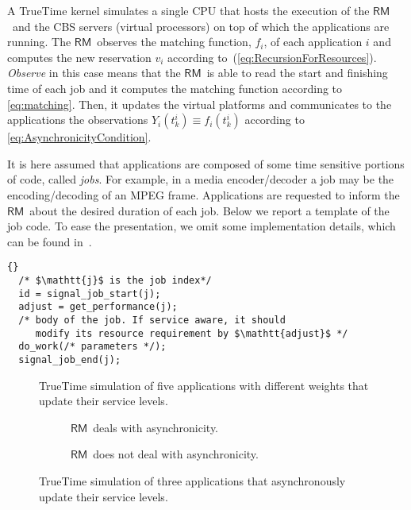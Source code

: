 \documentclass[letter,11pt]{article}
\newif\iffigures
\begin{document}
A TrueTime kernel simulates a single CPU that hosts the execution of the {$\mathsf{RM}$}\ and the CBS servers (virtual processors) on top of which the applications are running.
The {$\mathsf{RM}$}\ observes the matching function, $f_i$, of each application $i$ and computes the new reservation $v_i$ according to~(\ref{eq:RecursionForResources}). \emph{Observe} in this case means that the {$\mathsf{RM}$}\ is able to read the
start and finishing time of each job and it computes the matching function according to \eqref{eq:matching}. Then, it updates the virtual platforms and communicates to the applications the observations $Y_{i}(t^i_k)\equiv f_i(t^i_k)$ according to \eqref{eq:AsynchronicityCondition}.  

It is here assumed that applications are composed of some time sensitive portions of code, called \emph{jobs}. For example, in a media encoder/decoder a
job may be the encoding/decoding of an MPEG frame. Applications are
requested to inform the {$\mathsf{RM}$}\ about the desired duration of each
job. Below we report a template of the job code. To ease the
presentation, we omit some implementation details, which can be found
in~\cite{MagECRTS}.
\begin{lstlisting}[style=compactCStyle]{}
  /* $\mathtt{j}$ is the job index*/
  id = signal_job_start(j);
  adjust = get_performance(j);
  /* body of the job. If service aware, it should
     modify its resource requirement by $\mathtt{adjust}$ */
  do_work(/* parameters */);
  signal_job_end(j);
\end{lstlisting}
\begin{figure}[t]
  \begin{center}
    \iffigures
    
    \texttt{[image: figure\_truetime\_servicelevelweights\_new\_FULL\_ind.pdf]}
    \fi
    \caption{TrueTime simulation of five applications with
      different weights that update their service levels.}
    \label{fig:truetimedata_slvp}
  \end{center}
\end{figure}
\begin{figure*}[t]
\centering
\begin{subfigure}[b]{\columnwidth}
  \centering
    \iffigures
    
    \texttt{[image: figure\_truetime\_async\_new\_FULL\_ind.pdf]}
    \fi
    \caption{{$\mathsf{RM}$}\ deals with asynchronicity.}
    \label{fig:truetimedata_async}
\end{subfigure}
\begin{subfigure}[b]{\columnwidth}
  \centering
    \iffigures
    
    \texttt{[image: figure\_truetime\_async\_unhandled\_new\_FULL\_ind.pdf]}
    \fi
    \caption{{$\mathsf{RM}$}\ does not deal with asynchronicity.}
    \label{fig:truetimedata_async_unhandled}
\end{subfigure}\caption{TrueTime simulation of three applications that
      asynchronously update their service levels.}
\label{fig:asyncexp}
\end{figure*}
\end{document}
